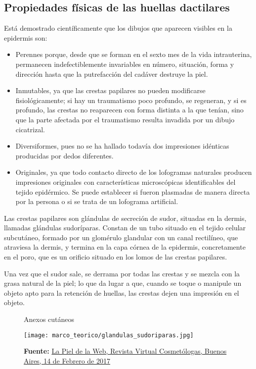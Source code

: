\documentclass[../principal]{subfiles}
\begin{document}
  \subsection{Propiedades físicas de las huellas dactilares}

  Está demostrado científicamente que los dibujos que aparecen visibles en la epidermis son:

  \begin{itemize}
    \setlength\itemsep{0.1em}
    \item Perennes porque, desde que se forman en el sexto mes de la vida intrauterina, permanecen indefectiblemente invariables en número, situación, forma y dirección hasta que la putrefacción del cadáver destruye la piel.
    \item Inmutables, ya que las crestas papilares no pueden modificarse fisiológicamente; si hay un traumatismo poco profundo, se regeneran, y si es profundo, las crestas no reaparecen con forma distinta a la que tenían, sino que la parte afectada por el traumatismo resulta invadida por un dibujo cicatrizal.
    \item Diversiformes, pues no se ha hallado todavía dos impresiones idénticas producidas por dedos diferentes.
    \item Originales, ya que todo contacto directo de los lofogramas naturales producen impresiones originales con características microscópicas identificables del tejido epidérmico. Se puede establecer si fueron plasmadas de manera directa por la persona o si se trata de un lofograma artificial.
  \end{itemize}

  Las crestas papilares son glándulas de secreción de sudor, situadas en la dermis, llamadas glándulas sudoríparas. Constan de un tubo situado en el tejido celular subcutáneo, formado por un glomérulo glandular con un canal rectilíneo, que atraviesa la dermis, y termina en la capa córnea de la epidermis, concretamente en el poro, que es un orificio situado en los lomos de las crestas papilares.

  Una vez que el sudor sale, se derrama por todas las crestas y se mezcla con la grasa natural de la piel; lo que da lugar a que, cuando se toque o manipule un objeto apto para la retención de huellas, las crestas dejen una impresión en el objeto.

  \begin{wrapfigure}[13]{l}[0pt]{0.6\textwidth}
    \centering
    \caption{Anexos cutáneos}
    \texttt{[image: marco\_teorico/glandulas\_sudoriparas.jpg]}
    \caption*{\textbf{Fuente:} \href{http://www.cosmetologas.com/noticias/val/2247/los-anexos-cutaneos.html}{La Piel de la Web, Revista Virtual Cosmetólogas, Buenos Aires, 14 de Febrero de 2017}}
  \end{wrapfigure}
\end{document}
